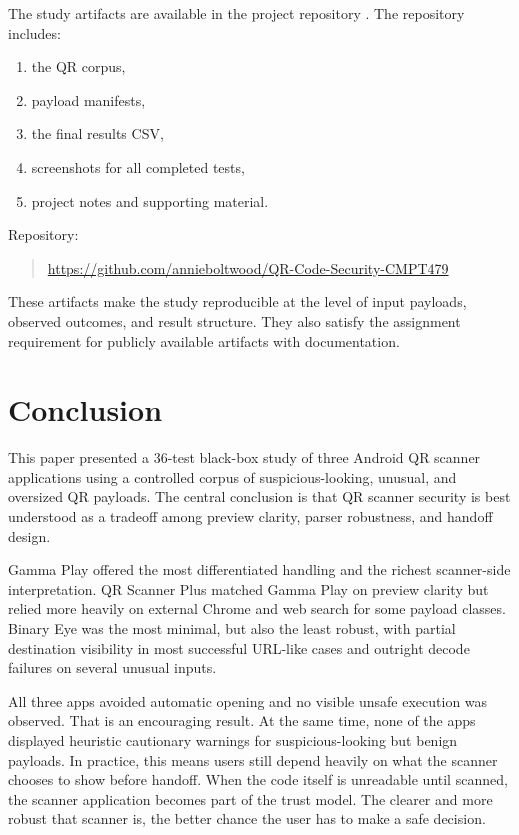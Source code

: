 \documentclass[11pt]{article}
\begin{document}
The study artifacts are available in the project repository \cite{repo}. The repository includes:
\begin{enumerate}[leftmargin=1.5em]
    \item the QR corpus,
    \item payload manifests,
    \item the final results CSV,
    \item screenshots for all completed tests,
    \item project notes and supporting material.
\end{enumerate}

Repository:
\begin{quote}
\url{https://github.com/annieboltwood/QR-Code-Security-CMPT479}
\end{quote}

These artifacts make the study reproducible at the level of input payloads, observed outcomes, and result structure. They also satisfy the assignment requirement for publicly available artifacts with documentation.

\section{Conclusion}

This paper presented a 36-test black-box study of three Android QR scanner applications using a controlled corpus of suspicious-looking, unusual, and oversized QR payloads. The central conclusion is that QR scanner security is best understood as a tradeoff among preview clarity, parser robustness, and handoff design.

Gamma Play offered the most differentiated handling and the richest scanner-side interpretation. QR Scanner Plus matched Gamma Play on preview clarity but relied more heavily on external Chrome and web search for some payload classes. Binary Eye was the most minimal, but also the least robust, with partial destination visibility in most successful URL-like cases and outright decode failures on several unusual inputs.

All three apps avoided automatic opening and no visible unsafe execution was observed. That is an encouraging result. At the same time, none of the apps displayed heuristic cautionary warnings for suspicious-looking but benign payloads. In practice, this means users still depend heavily on what the scanner chooses to show before handoff. When the code itself is unreadable until scanned, the scanner application becomes part of the trust model. The clearer and more robust that scanner is, the better chance the user has to make a safe decision.
\end{document}
